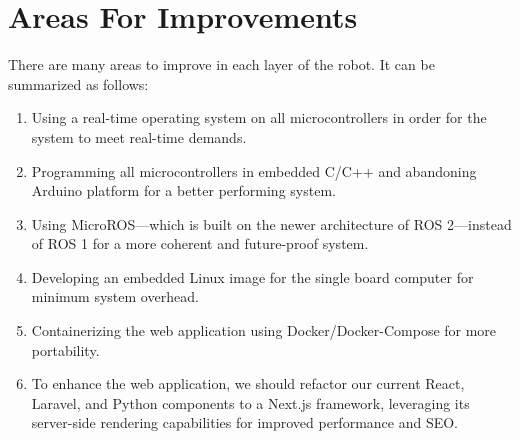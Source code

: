 \section{Areas For Improvements}
There are many areas to improve in each layer of the robot. It can be summarized as follows:
\begin{enumerate}
    \item Using a real-time operating system on all microcontrollers in order for the system to meet real-time demands.
    \item Programming all microcontrollers in embedded C/C++ and abandoning Arduino platform for a better performing system.
    \item Using MicroROS---which is built on the newer architecture of ROS 2---instead of ROS 1 for a more coherent and future-proof system.
    \item Developing an embedded Linux image for the single board computer for minimum system overhead.
    \item Containerizing the web application using Docker/Docker-Compose for more portability.
    \item To enhance the web application, we should refactor our current React, Laravel, and Python components to a Next.js framework, leveraging its server-side rendering capabilities for improved performance and SEO.
\end{enumerate}